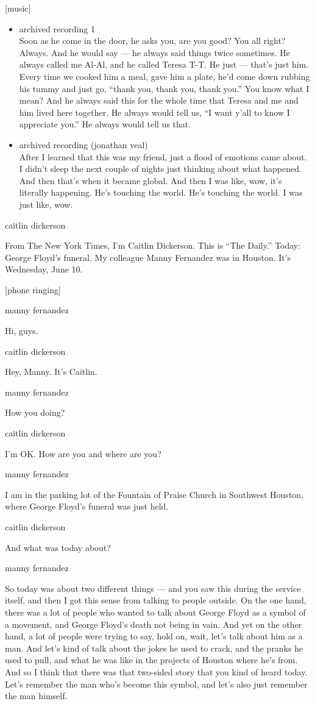 {[}music{]}

\begin{itemize}
\item
  archived recording 1\\
  Soon as he come in the door, he asks you, are you good? You all right?
  Always. And he would say --- he always said things twice sometimes. He
  always called me Al-Al, and he called Teresa T-T. He just --- that's
  just him. Every time we cooked him a meal, gave him a plate, he'd come
  down rubbing his tummy and just go, ``thank you, thank you, thank
  you.'' You know what I mean? And he always said this for the whole
  time that Teresa and me and him lived here together. He always would
  tell us, ``I want y'all to know I appreciate you.'' He always would
  tell us that.
\item
  archived recording (jonathan veal)\\
  After I learned that this was my friend, just a flood of emotions came
  about. I didn't sleep the next couple of nights just thinking about
  what happened. And then that's when it became global. And then I was
  like, wow, it's literally happening. He's touching the world. He's
  touching the world. I was just like, wow.
\end{itemize}

caitlin dickerson

From The New York Times, I'm Caitlin Dickerson. This is ``The Daily.''
Today: George Floyd's funeral. My colleague Manny Fernandez was in
Houston. It's Wednesday, June 10.

{[}phone ringing{]}

manny fernandez

Hi, guys.

caitlin dickerson

Hey, Manny. It's Caitlin.

manny fernandez

How you doing?

caitlin dickerson

I'm OK. How are you and where are you?

manny fernandez

I am in the parking lot of the Fountain of Praise Church in Southwest
Houston, where George Floyd's funeral was just held.

caitlin dickerson

And what was today about?

manny fernandez

So today was about two different things --- and you saw this during the
service itself, and then I got this sense from talking to people
outside. On the one hand, there was a lot of people who wanted to talk
about George Floyd as a symbol of a movement, and George Floyd's death
not being in vain. And yet on the other hand, a lot of people were
trying to say, hold on, wait, let's talk about him as a man. And let's
kind of talk about the jokes he used to crack, and the pranks he used to
pull, and what he was like in the projects of Houston where he's from.
And so I think that there was that two-sided story that you kind of
heard today. Let's remember the man who's become this symbol, and let's
also just remember the man himself.

